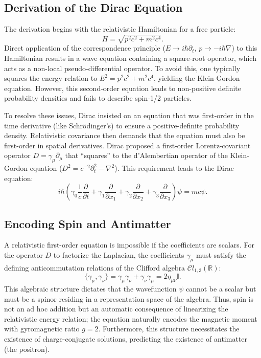 \subsection{Derivation of the Dirac Equation}
The derivation begins with the relativistic Hamiltonian for a free particle:
\begin{equation}
	H=\sqrt{p^{2}c^{2}+m^{2}c^{4}}.
\end{equation}
Direct application of the correspondence principle ($E \to i\hbar \partial_t$,
$p \to -i\hbar \nabla$) to this Hamiltonian results in a wave equation
containing a square-root operator, which acts as a non-local pseudo-differential
operator. To avoid this, one typically squares the energy relation to $E^{2} =
p^{2}c^{2}+m^{2}c^{4}$, yielding the Klein-Gordon equation. However, this
second-order equation leads to non-positive definite probability densities and
fails to describe spin-1/2 particles.

To resolve these issues, Dirac insisted on an equation that was first-order in
the time derivative (like Schrödinger's) to ensure a positive-definite
probability density. Relativistic covariance then demands that the equation must
also be first-order in spatial derivatives. Dirac proposed a first-order
Lorentz-covariant operator $D=\gamma_{\mu}\partial_{\mu}$ that ``squares'' to the
d'Alembertian operator of the Klein-Gordon equation
($D^{2}=c^{-2}\partial_{t}^{2}-\nabla^{2}$).
This requirement leads to the Dirac equation:
\begin{equation}
	i\hbar\left(\gamma_{0}\frac{1}{c}\frac{\partial}{\partial t}+\gamma_{1}
		\frac{\partial}{\partial x_{1}}+\gamma_{2}\frac{\partial}{\partial x_{2}}+
	\gamma_{3}\frac{\partial}{\partial x_{3}}\right)\psi=mc\psi.
\end{equation}

\subsection{Encoding Spin and Antimatter}
A relativistic first-order equation is impossible if the coefficients are
scalars. For the operator $D$ to factorize the Laplacian, the coefficients
$\gamma_{\mu}$ must satisfy the defining anticommutation relations of the
Clifford algebra $\mathcal{C}l_{1,3}(\mathbb{R})$:
\begin{equation}
	\{\gamma_{\mu}, \gamma_{\nu}\} = \gamma_{\mu}\gamma_{\nu}+\gamma_{\nu}
	\gamma_{\mu}=2\eta_{\mu\nu}\mathbb{I}.
\end{equation}
This algebraic structure dictates that the wavefunction $\psi$ cannot be a
scalar but must be a spinor residing in a representation space of the algebra.
Thus, spin is not an ad hoc addition but an automatic consequence of linearizing
the relativistic energy relation; the equation naturally encodes the magnetic
moment with gyromagnetic ratio $g=2$. Furthermore, this structure necessitates
the existence of charge-conjugate solutions, predicting the existence of
antimatter (the positron).

